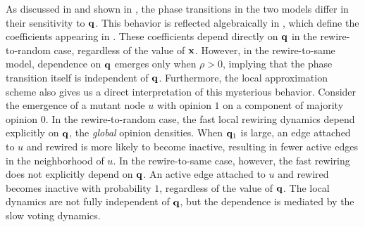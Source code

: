 \documentclass[review, onefignum, onetabnum]{siamart171218}
\newcommand{\pjm}[1]{{\color{blue}[PJM: #1]}}
\newcommand{\pc}[1]{{\color{comment_purple}[PC: #1]}}
\begin{document}
		As discussed in \cite{Durrett2012} and shown in , the phase transitions in the two models differ in their sensitivity to $\mathbf{q}$. 
		This behavior is reflected algebraically in , which define the coefficients appearing in . 
		These coefficients depend directly on $\mathbf{q}$ in the rewire-to-random case, regardless of the value of $\mathbf{x}$. 
		However,  in the rewire-to-same model, dependence on $\mathbf{q}$ emerges only when $\rho > 0$, implying that the phase transition itself is independent of $\mathbf{q}$. 
		Furthermore, the local approximation scheme also gives us a direct interpretation of this mysterious behavior. 
		Consider the emergence of a mutant node $u$ with opinion $1$ on a component of majority opinion $0$. 
		In the rewire-to-random case, the fast local rewiring dynamics depend explicitly on $\mathbf{q}$, the \emph{global} opinion densities. 
		When $\mathbf{q}_1$ is large, an edge attached to $u$ and rewired is more likely to become inactive, resulting in fewer active edges in the neighborhood of $u$. 
		In the rewire-to-same case, however, the fast rewiring does not explicitly depend on $\mathbf{q}$. 
		An active edge attached to $u$ and rewired becomes inactive with probability $1$, regardless of the value of $\mathbf{q}$. 
		The local dynamics are not fully independent of $\mathbf{q}$, but the dependence is mediated by the slow voting dynamics. 
	
\end{document}
